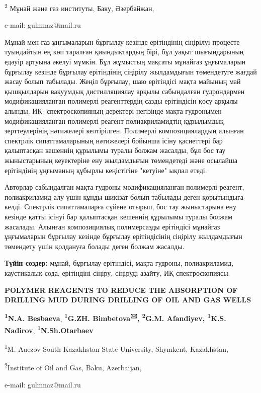 \textsuperscript{2} Мұнай және газ институты, Баку, Әзербайжан,

e-mail: gulmnaz@mail.ru

Мұнай мен газ ұңғымаларын бұрғылау кезінде ерітіндінің сіңірілуі
процесте туындайтын ең көп таралған қиындықтардың бірі, бұл уақыт
шығындарының едәуір артуына әкелуі мүмкін. Бұл жұмыстың мақсаты мұнайгаз
ұңғымаларын бұрғылау кезінде бұрғылау ерітіндінің сіңірілу жылдамдығын
төмендетуге жағдай жасау болып табылады. Жеңіл бұрғылау, шаю ерітіндісі
мақта майының май қышқылдарын вакуумдық дистилляциялау арқылы
сабындалған гудрондармен модификацияланған полимерлі реагенттердің сазды
ерітіндісін қосу арқылы алынды. ИҚ- спектроскопияның деректері негізінде
мақта гудронымен модификацияланған полимерлі реагент полиакриламидтің
құрылымдық зерттеулерінің нәтижелері келтірілген. Полимерлі
композициялардың алынған спектрлік сипаттамаларының нәтижелері бойынша
ісіну қасиеттері бар қалыптасқан кешеннің құрылымы туралы болжам
жасалды, бұл бос тау жыныстарының кеуектеріне ену жылдамдығын
төмендетеді және осылайша ерітіндінің ұңғыманың құбырлы кеңістігіне
"кетуіне" ықпал етеді.

Авторлар сабындалған мақта гудроны модификацияланған полимерлі реагент,
полиакриламид алу үшін құнды шикізат болып табылады деген қорытындыға
келді. Спектрлік сипаттамаларға сүйене отырып, бос тау жыныстарына ену
кезінде қатты ісінуі бар қалыптасқан кешеннің құрылымы туралы болжам
жасалады. Алынған композициялық полимерсазды ерітіндісі мұнайгаз
ұңғымаларын бұрғылау кезінде бұрғылау ерітіндісінің сіңірілу жылдамдығын
төмендету үшін қолдануға болады деген болжам жасалды.

{\bfseries Түйін сөздер:} мұнай, бұрғылау ерітіндісі, мақта гудроны,
полиакриламид, каустикалық сода, ерітіндіні сіңіру, сіңіруді азайту, ИҚ
спектроскопиясы.

{\bfseries POLYMER REAGENTS TO REDUCE THE ABSORPTION OF DRILLING MUD DURING
DRILLING OF OIL AND GAS WELLS}

{\bfseries \textsuperscript{1}N.A. Besbaeva},
{\bfseries \textsuperscript{1}G.ZH. Bimbetova\textsuperscript{🖂},
\textsuperscript{2}G.M. Afandiyev, \textsuperscript{1}K.S. Nadirov},
{\bfseries \textsuperscript{1}N.Sh.Otarbaev}

\textsuperscript{1}M. Auezov South Kazakhstan State University,
Shymkent, Kazakhstan,

\textsuperscript{2}Institute of Oil and Gas, Baku, Azerbaijan,

e-mail: gulmnaz@mail.ru

